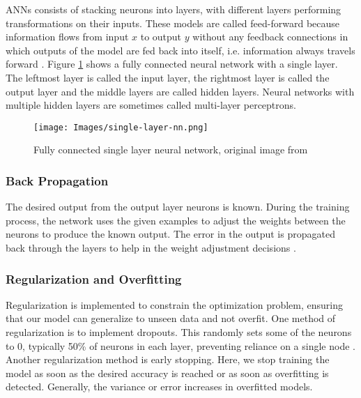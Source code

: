 ANNs consists of stacking neurons into layers, with different layers performing transformations on their inputs. These models are called feed-forward because information flows from input $x$ to output $y$ without any feedback connections in which outputs of the model are fed back into itself, i.e. information always travels forward \cite{deep-learning-book}. Figure \ref{fig:nn-architecture} shows a fully connected neural network with a single layer. The leftmost layer is called the input layer, the rightmost layer is called the output layer and the middle layers are called hidden layers. Neural networks with multiple hidden layers are sometimes called multi-layer perceptrons.

\begin{figure}[H]
\begin{center}
    \texttt{[image: Images/single-layer-nn.png]}
    \caption{Fully connected single layer neural network, original image from \cite{methods-for-ds-slides}}
    \label{fig:nn-architecture}
\end{center}
\end{figure}

\subsubsection{Back Propagation}

The desired output from the output layer neurons is known. During the training process, the network uses the given examples to adjust the weights between the neurons to produce the known output. The error in the output is propagated back through the layers to help in the weight adjustment decisions \cite{ann-prediction}.

\subsubsection{Regularization and Overfitting}

Regularization is implemented to constrain the optimization problem, ensuring that our model can generalize to unseen data and not overfit. One method of regularization is to implement dropouts. This randomly sets some of the neurons to 0, typically 50\% of neurons in each layer, preventing reliance on a single node \cite{methods-for-ds-slides}. Another regularization method is early stopping. Here, we stop training the model as soon as the desired accuracy is reached or as soon as overfitting is detected. Generally, the variance or error increases in overfitted models. 

